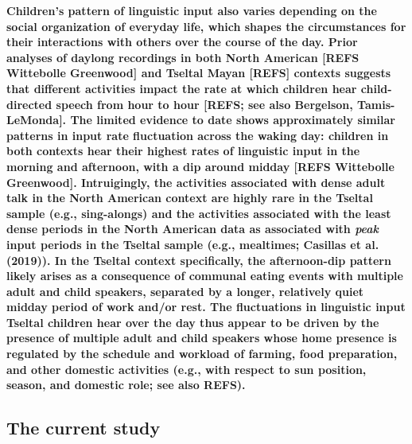 \documentclass[,man,floatsintext]{apa6}
\begin{document}
\textbf{Children's pattern of linguistic input also varies depending on
the social organization of everyday life, which shapes the circumstances
for their interactions with others over the course of the day. Prior
analyses of daylong recordings in both North American {[}REFS Wittebolle
Greenwood{]} and Tseltal Mayan {[}REFS{]} contexts suggests that
different activities impact the rate at which children hear
child-directed speech from hour to hour {[}REFS; see also Bergelson,
Tamis-LeMonda{]}. The limited evidence to date shows approximately
similar patterns in input rate fluctuation across the waking day:
children in both contexts hear their highest rates of linguistic input
in the morning and afternoon, with a dip around midday {[}REFS
Wittebolle Greenwood{]}. Intruigingly, the activities associated with
dense adult talk in the North American context are highly rare in the
Tseltal sample (e.g., sing-alongs) and the activities associated with
the least dense periods in the North American data as associated with
\emph{peak} input periods in the Tseltal sample (e.g., mealtimes;
Casillas et al. (2019)). In the Tseltal context specifically, the
afternoon-dip pattern likely arises as a consequence of communal eating
events with multiple adult and child speakers, separated by a longer,
relatively quiet midday period of work and/or rest. The fluctuations in
linguistic input Tseltal children hear over the day thus appear to be
driven by the presence of multiple adult and child speakers whose home
presence is regulated by the schedule and workload of farming, food
preparation, and other domestic activities (e.g., with respect to sun
position, season, and domestic role; see also REFS).}

\subsection{The current study}\label{the-current-study}
\end{document}
